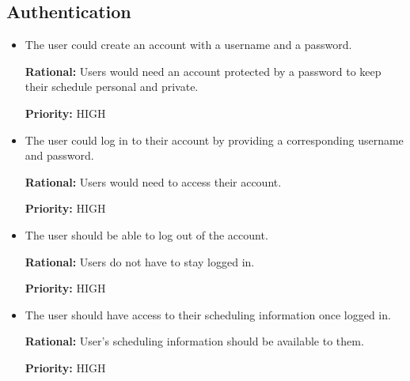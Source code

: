 \documentclass[12pt]{article}
\newcounter{reqnum} %
\newcommand{\rthereqnum}{FR\refstepcounter{reqnum}\thereqnum:}
\begin{document}
\subsection{Authentication}
\begin{itemize}

\item[\rthereqnum]
The user could create an account with a username and a password.

\textbf{Rational:} Users would need an account protected by a password to keep their schedule personal and private.

\textbf{Priority:} HIGH
\item[\rthereqnum]
The user could log in to their account by providing a corresponding username and password.

\textbf{Rational:} Users would need to access their account.

\textbf{Priority:} HIGH
\item[\rthereqnum]
The user should be able to log out of the account.

\textbf{Rational:} Users do not have to stay logged in.

\textbf{Priority:} HIGH
\item[\rthereqnum]
The user should have access to their scheduling information once logged in.

\textbf{Rational:} User's scheduling information should be available to them.

\textbf{Priority:} HIGH

\end{itemize}
\end{document}
